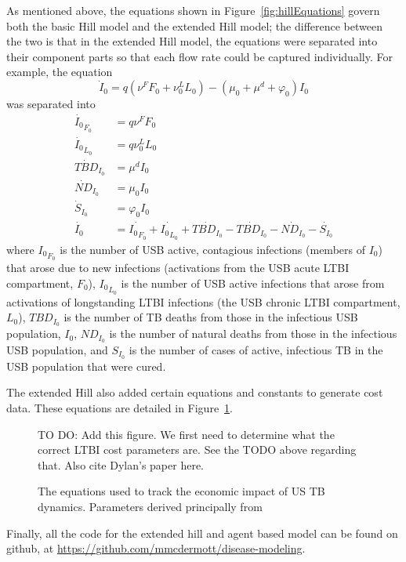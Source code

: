 \documentclass{amsart}
\renewcommand{\(}{\left(}
\renewcommand{\)}{\right)}
\newcommand{\TODO}[1]{\begin{framed}{\huge \color{red} TO DO:}
  #1 \end{framed}}
\begin{document}
As mentioned above, the equations shown in Figure~\ref{fig:hillEquations} govern
both the basic Hill model and the extended Hill model; the difference between
the two is that in the extended Hill model, the equations were separated into
their component parts so that each flow rate could be captured individually. For
example, the equation
\[\dot{I}_0 = q(\nu^FF_0 + \nu_0^LL_0) - (\mu_0+\mu^d+\varphi_0)I_0\]
was separated into 
\begin{align*}
  \dot{{I_0}}_{F_0} &= q \nu^F F_0\\
  \dot{{I_0}}_{L_0} &= q \nu_0^L L_0\\
  \dot{{TBD}}_{I_0} &= \mu^dI_0 \\
  \dot{{ND}}_{I_0}  &= \mu_0I_0 \\
  \dot{{S}}_{I_0}   &= \varphi_0 I_0\\
  \dot{I_0}         &= \dot{{I_0}_{F_0}} + \dot{{I_0}_{L_0}} +
                       \dot{{TBD}_{I_0}} - \dot{{TBD}_{I_0}} -
                       \dot{{ND}_{I_0}}  - \dot{S_{I_0}}
\end{align*}
where ${I_0}_{F_0}$ is the number of USB active, contagious infections (members
of $I_0$) that arose due to new infections (activations from the USB acute LTBI
compartment, $F_0$), ${I_0}_{L_0}$ is the number of USB active infections that
arose from activations of longstanding LTBI infections (the USB chronic LTBI
compartment, $L_0$), ${TBD}_{I_0}$ is the number of TB deaths from those in the
infectious USB population, $I_0$, $ND_{I_0}$ is the number of natural deaths
from those in the infectious USB population, and $S_{I_0}$ is the number of
cases of active, infectious TB in the USB population that were cured. 

The extended Hill also added certain equations and constants to generate cost
data. These equations are detailed in Figure~\ref{fig:hillCosts}.
\begin{figure}[h]
  \centering
  \TODO{Add this figure. We first need to determine what the correct LTBI
  cost parameters are. See the TODO above regarding that. Also cite Dylan's
paper here.}
  \caption{The equations used to track the economic impact of US TB dynamics.
  Parameters derived principally from
  \cite{lobue_use_2003,page_kr_improved_2006,denholm_use_2010}}
  \label{fig:hillCosts}
\end{figure}


Finally, all the code for the extended hill and agent based model can be found
on github, at \url{https://github.com/mmcdermott/disease-modeling}.

\newpage


\end{document}
